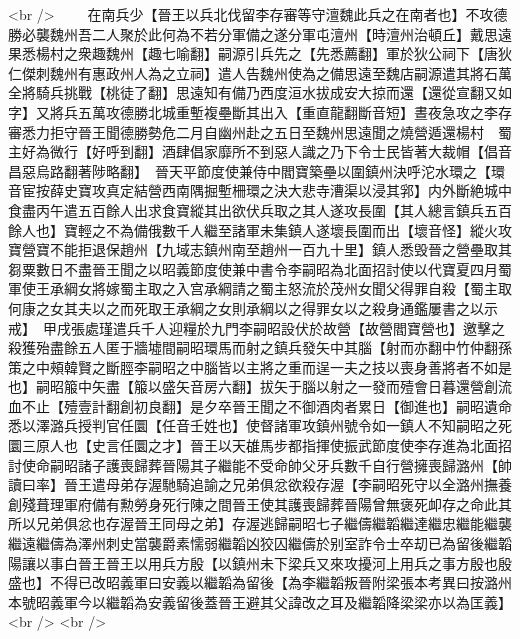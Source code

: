 <br />
　　在南兵少【晉王以兵北伐留李存審等守澶魏此兵之在南者也】不攻德勝必襲魏州吾二人聚於此何為不若分軍備之遂分軍屯澶州【時澶州治頓丘】戴思遠果悉楊村之衆趣魏州【趣七喻翻】嗣源引兵先之【先悉薦翻】軍於狄公祠下【唐狄仁傑刺魏州有惠政州人為之立祠】遣人告魏州使為之備思遠至魏店嗣源遣其將石萬全將騎兵挑戰【桃徒了翻】思遠知有備乃西度洹水拔成安大掠而還【還從宣翻又如字】又將兵五萬攻德勝北城重塹複壘斷其出入【重直龍翻斷音短】晝夜急攻之李存審悉力拒守晉王聞德勝勢危二月自幽州赴之五日至魏州思遠聞之燒營遁還楊村　蜀主好為微行【好呼到翻】酒肆倡家靡所不到惡人識之乃下令士民皆著大裁帽【倡音昌惡烏路翻著陟略翻】　晉天平節度使兼侍中閻寶築壘以圍鎮州決呼沱水環之【環音宦按薛史寶攻真定結營西南隅掘塹柵環之決大悲寺漕渠以浸其郛】内外斷絶城中食盡丙午遣五百餘人出求食寶縱其出欲伏兵取之其人遂攻長圍【其人總言鎮兵五百餘人也】寶輕之不為備俄數千人繼至諸軍未集鎮人遂壞長圍而出【壞音怪】縱火攻寶營寶不能拒退保趙州【九域志鎮州南至趙州一百九十里】鎮人悉毁晉之營壘取其芻粟數日不盡晉王聞之以昭義節度使兼中書令李嗣昭為北面招討使以代寶夏四月蜀軍使王承綱女將嫁蜀主取之入宫承綱請之蜀主怒流於茂州女聞父得罪自殺【蜀主取何康之女其夫以之而死取王承綱之女則承綱以之得罪女以之殺身通鑑屢書之以示戒】　甲戌張處瑾遣兵千人迎糧於九門李嗣昭設伏於故營【故營閻寶營也】邀擊之殺獲殆盡餘五人匿于牆墟間嗣昭環馬而射之鎮兵發矢中其腦【射而亦翻中竹仲翻孫策之中頰韓賢之斷脛李嗣昭之中腦皆以主將之重而逞一夫之技以喪身善將者不如是也】嗣昭箙中矢盡【箙以盛矢音房六翻】拔矢于腦以射之一發而殪會日暮還營創流血不止【殪壹計翻創初良翻】是夕卒晉王聞之不御酒肉者累日【御進也】嗣昭遺命悉以澤潞兵授判官任圜【任音壬姓也】使督諸軍攻鎮州號令如一鎮人不知嗣昭之死圜三原人也【史言任圜之才】晉王以天䧺馬步都指揮使振武節度使李存進為北面招討使命嗣昭諸子護喪歸葬晉陽其子繼能不受命帥父牙兵數千自行營擁喪歸潞州【帥讀曰率】晉王遣母弟存渥馳騎追諭之兄弟俱忿欲殺存渥【李嗣昭死守以全潞州撫養創殘葺理軍府備有勲勞身死行陳之間晉王使其護喪歸葬晉陽曾無褒死卹存之命此其所以兄弟俱忿也存渥晉王同母之弟】存渥逃歸嗣昭七子繼儔繼韜繼達繼忠繼能繼襲繼遠繼儔為澤州刺史當襲爵素懦弱繼韜凶狡囚繼儔於别室詐令士卒刧已為留後繼韜陽讓以事白晉王晉王以用兵方殷【以鎮州未下梁兵又來攻擾河上用兵之事方殷也殷盛也】不得已改昭義軍曰安義以繼韜為留後【為李繼韜叛晉附梁張本考異曰按潞州本號昭義軍今以繼韜為安義留後蓋晉王避其父諱改之耳及繼韜降梁梁亦以為匡義】<br />
<br />
